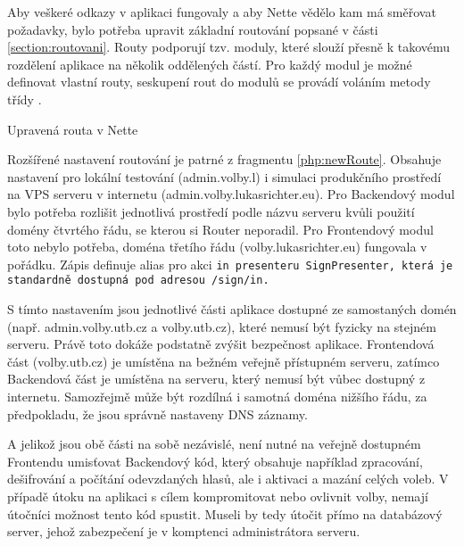 Aby veškeré odkazy v aplikaci fungovaly a aby Nette vědělo kam má směřovat požadavky, bylo potřeba upravit základní routování popsané v části \ref{section:routovani}. Routy podporují tzv. moduly, které slouží přesně k takovému rozdělení aplikace na několik oddělených částí. Pro každý modul je možné definovat vlastní routy, seskupení rout do modulů se provádí voláním metody  %
třídy . 

\begin{listing}[ht]
\caption{Upravená routa v Nette}
\label{php:newRoute}
\end{listing}

Rozšířené nastavení routování je patrné z fragmentu \ref{php:newRoute}. Obsahuje nastavení pro lokální testování (admin.volby.l) i simulaci produkčního prostředí na VPS serveru v internetu (admin.volby.lukasrichter.eu). Pro Backendový modul bylo potřeba rozlišit jednotlivá prostředí podle názvu serveru kvůli použití domény čtvrtého řádu, se kterou si Router neporadil. Pro Frontendový modul toto nebylo potřeba, doména třetího řádu (volby.lukasrichter.eu) fungovala v pořádku. Zápis  definuje alias pro akci \tt{in} presenteru \tt{SignPresenter}, která je standardně dostupná pod adresou \tt{/sign/in}.

S tímto nastavením jsou jednotlivé části aplikace dostupné ze samostaných domén (např. admin.volby.utb.cz a volby.utb.cz), které nemusí být fyzicky na stejném serveru. Právě toto dokáže podstatně zvýšit bezpečnost aplikace. Frontendová část (volby.utb.cz) je umístěna na bežném veřejně přístupném serveru, zatímco Backendová část je umístěna na serveru, který nemusí být vůbec dostupný z internetu. Samozřejmě může být rozdílná i samotná doména nižšího řádu, za předpokladu, že jsou správně nastaveny DNS záznamy.

A jelikož jsou obě části na sobě nezávislé, není nutné na veřejně dostupném Frontendu umisťovat Backendový kód, který obsahuje například zpracování, dešifrování a počítání odevzdaných hlasů, ale i aktivaci a mazání celých voleb. V případě útoku na aplikaci s cílem kompromitovat nebo ovlivnit volby, nemají útočníci možnost tento kód spustit. Museli by tedy útočit přímo na databázový server, jehož zabezpečení je v komptenci administrátora serveru.